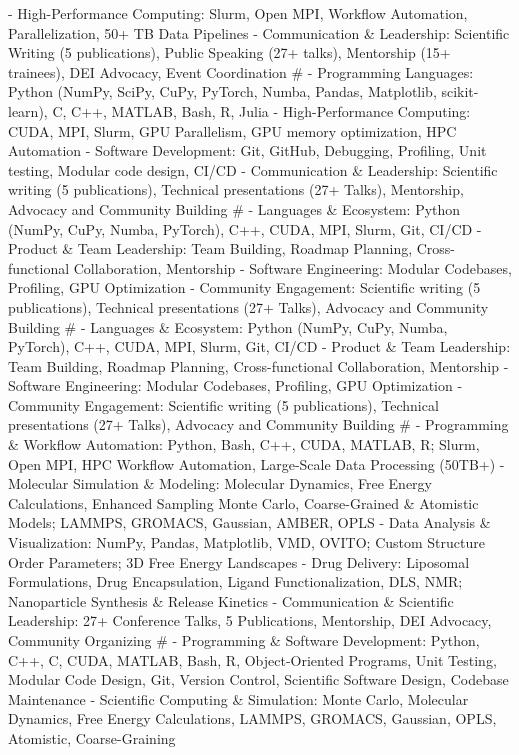 - High-Performance Computing: Slurm, Open MPI, Workflow Automation, Parallelization, 50+ TB Data Pipelines
- Communication \& Leadership: Scientific Writing (5 publications), Public Speaking (27+ talks), Mentorship (15+ trainees), DEI Advocacy, Event Coordination
#
- Programming Languages: Python (NumPy, SciPy, CuPy, PyTorch, Numba, Pandas, Matplotlib, scikit-learn), C, C++, MATLAB, Bash, R, Julia
- High-Performance Computing: CUDA, MPI, Slurm, GPU Parallelism, GPU memory optimization, HPC Automation
- Software Development: Git, GitHub, Debugging, Profiling, Unit testing, Modular code design, CI/CD
- Communication \& Leadership: Scientific writing (5 publications), Technical presentations (27+ Talks), Mentorship, Advocacy and Community Building
#
- Languages \& Ecosystem: Python (NumPy, CuPy, Numba, PyTorch), C++, CUDA, MPI, Slurm, Git, CI/CD
- Product \& Team Leadership: Team Building, Roadmap Planning, Cross-functional Collaboration, Mentorship
- Software Engineering: Modular Codebases, Profiling, GPU Optimization
- Community Engagement: Scientific writing (5 publications), Technical presentations (27+ Talks), Advocacy and Community Building
#
- Languages \& Ecosystem: Python (NumPy, CuPy, Numba, PyTorch), C++, CUDA, MPI, Slurm, Git, CI/CD
- Product \& Team Leadership: Team Building, Roadmap Planning, Cross-functional Collaboration, Mentorship
- Software Engineering: Modular Codebases, Profiling, GPU Optimization
- Community Engagement: Scientific writing (5 publications), Technical presentations (27+ Talks), Advocacy and Community Building
#
- Programming \& Workflow Automation: Python, Bash, C++, CUDA, MATLAB, R; Slurm, Open MPI, HPC Workflow Automation, Large-Scale Data Processing (50TB+)
- Molecular Simulation \& Modeling: Molecular Dynamics, Free Energy Calculations, Enhanced Sampling Monte Carlo, Coarse-Grained \& Atomistic Models; LAMMPS, GROMACS, Gaussian, AMBER, OPLS
- Data Analysis \& Visualization: NumPy, Pandas, Matplotlib, VMD, OVITO; Custom Structure Order Parameters; 3D Free Energy Landscapes
- Drug Delivery: Liposomal Formulations, Drug Encapsulation, Ligand Functionalization, DLS, NMR; Nanoparticle Synthesis \& Release Kinetics
- Communication \& Scientific Leadership: 27+ Conference Talks, 5 Publications, Mentorship, DEI Advocacy, Community Organizing
#
- Programming \& Software Development: Python, C++, C, CUDA, MATLAB, Bash, R, Object-Oriented Programs, Unit Testing, Modular Code Design, Git, Version Control, Scientific Software Design, Codebase Maintenance
- Scientific Computing \& Simulation: Monte Carlo, Molecular Dynamics, Free Energy Calculations, LAMMPS, GROMACS, Gaussian, OPLS, Atomistic, Coarse-Graining
